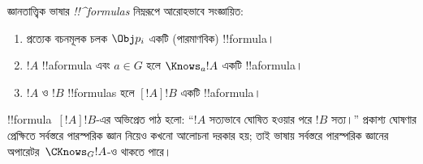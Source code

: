 \documentclass[../../../include/open-logic-section]{subfiles}
\begin{document}
\begin{defn}
  জ্ঞানতাত্ত্বিক ভাষার \emph{!!^{formula}s} নিম্নরূপে আরোহভাবে সংজ্ঞায়িত:
  \begin{enumerate}


  \item প্রত্যেক বচনমূলক চলক $\Obj p_i$ একটি (পারমাণবিক) !!{formula}।






  \item $!A$ !!a{formula} এবং $a \in G$ হলে $\Knows_a !A$
  একটি !!a{formula}।

  \item $!A$ ও $!B$ !!{formula}s হলে $[!A] !B$ একটি !!a{formula}।

\end{enumerate}
\end{defn}

!!{formula}~$[!A] !B$-এর অভিপ্রেত পাঠ হলো: ``$!A$ সত্যভাবে ঘোষিত হওয়ার পরে $!B$ সত্য।'' প্রকাশ্য ঘোষণার প্রেক্ষিতে সর্বস্তরে পারস্পরিক জ্ঞান নিয়েও কখনো আলোচনা দরকার হয়; তাই ভাষায় সর্বস্তরে পারস্পরিক জ্ঞানের অপারেটর~$\CKnows_G
!A$-ও থাকতে পারে।
\end{document}
